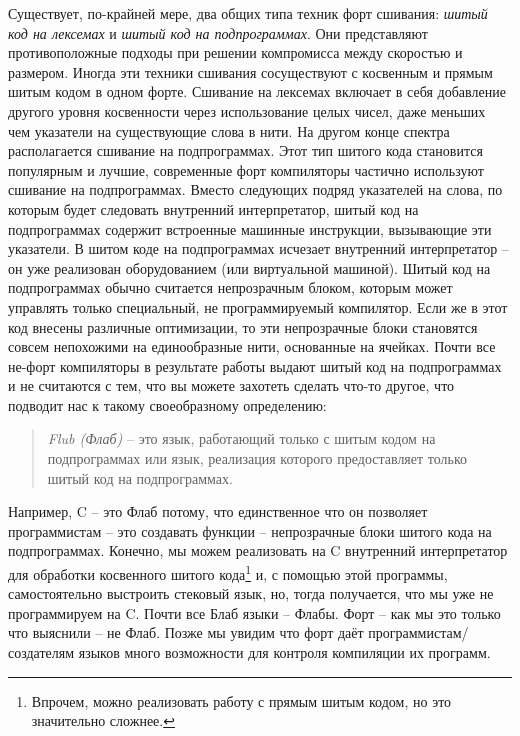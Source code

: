 Существует, по-крайней мере, два общих типа техник форт сшивания: \emph{шитый код на лексемах} и \emph{шитый код на подпрограммах}. Они представляют противоположные подходы при решении компромисса между скоростью и размером. Иногда эти техники сшивания сосуществуют с косвенным и прямым шитым кодом в одном форте. Сшивание на лексемах включает в себя добавление другого уровня косвенности через использование целых чисел, даже меньших чем указатели на существующие слова в нити. На другом конце спектра располагается сшивание на подпрограммах. Этот тип шитого кода становится популярным и лучшие, современные форт компиляторы частично используют сшивание на подпрограммах. Вместо следующих подряд указателей на слова, по которым будет следовать внутренний интерпретатор, шитый код на подпрограммах содержит встроенные машинные инструкции, вызывающие эти указатели. В шитом коде на подпрограммах исчезает внутренний интерпретатор -- он уже реализован оборудованием (или виртуальной машиной). Шитый код на подпрограммах обычно считается непрозрачным блоком, которым может управлять только специальный, не программируемый компилятор. Если же в этот код внесены различные оптимизации, то эти непрозрачные блоки становятся совсем непохожими на единообразные нити, основанные на ячейках. Почти все не-форт компиляторы в результате работы выдают шитый код на подпрограммах и не считаются с тем, что вы можете захотеть сделать что-то другое, что подводит нас к такому своеобразному определению:

\begin{quote}
\emph{Flub (Флаб)} -- это язык, работающий только с шитым кодом на подпрограммах или язык, реализация которого предоставляет только шитый код на подпрограммах.
\end{quote}

Например, C -- это Флаб потому, что единственное что он позволяет программистам -- это создавать функции -- непрозрачные блоки шитого кода на подпрограммах. Конечно, мы можем реализовать на C внутренний интерпретатор для обработки косвенного шитого кода\footnote{Впрочем, можно реализовать работу с прямым шитым кодом, но это значительно сложнее.} и, с помощью этой программы, самостоятельно выстроить стековый язык, но, тогда получается, что мы уже не программируем на C. Почти все Блаб языки -- Флабы. Форт -- как мы это только что выяснили -- не Флаб. Позже мы увидим что форт даёт программистам/создателям языков много возможности для контроля компиляции их программ.

